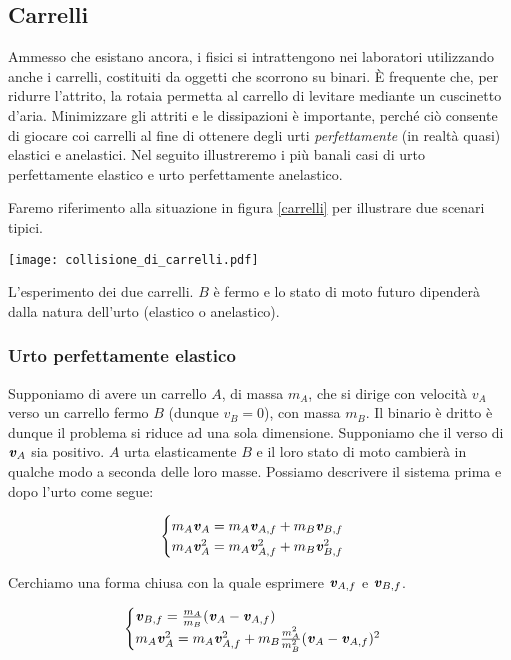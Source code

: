 \subsection{Carrelli}
Ammesso che esistano ancora, i fisici si intrattengono nei laboratori
utilizzando anche i carrelli, costituiti da oggetti che scorrono su
binari. È frequente che, per ridurre l'attrito, la rotaia permetta al
carrello di levitare mediante un cuscinetto d'aria. Minimizzare gli
attriti e le dissipazioni è importante, perché ciò consente di giocare
coi carrelli al fine di ottenere degli urti \textit{perfettamente} (in
realtà quasi) elastici e anelastici. Nel seguito illustreremo i più
banali casi di urto perfettamente elastico e urto perfettamente anelastico.

Faremo riferimento alla situazione in figura \ref{carrelli} per
illustrare due scenari tipici.
\begin{marginfigure}
    \centering
    \texttt{[image: collisione\_di\_carrelli.pdf]}
    \caption{L'esperimento dei due carrelli. $B$ è fermo e lo
    stato di moto futuro dipenderà dalla natura dell'urto (elastico
    o anelastico).}
    \label{carrelli}
\end{marginfigure}

\subsubsection*{Urto perfettamente elastico}
Supponiamo di avere un carrello $A$, di massa $m_A$, che si dirige con velocità $v_A$
verso un carrello fermo $B$ (dunque $v_B = 0$), con massa $m_B$. Il binario è dritto
è dunque il problema si riduce ad una sola dimensione. Supponiamo
che il verso di $\textbf{\textit{v}}_A$ sia positivo. $A$ urta elasticamente
$B$ e il loro stato di moto cambierà in qualche modo a seconda delle
loro masse. Possiamo descrivere il sistema prima e dopo l'urto come
segue:

\[
\begin{cases}
    m_A\textbf{\textit{v}}_A = m_A\textbf{\textit{v}}_{A,f} + m_B\textbf{\textit{v}}_{B,f}\\
    m_A\textbf{\textit{v}}_A^2 = m_A\textbf{\textit{v}}_{A,f}^2 + m_B\textbf{\textit{v}}_{B,f}^2
\end{cases}
\]

\noindent Cerchiamo una forma chiusa con la quale esprimere $\textbf{\textit{v}}_{A,f}$
e $\textbf{\textit{v}}_{B,f}$.

\[
\begin{cases}
    \textbf{\textit{v}}_{B,f} = \frac{m_A}{m_B}(\textbf{\textit{v}}_A - \textbf{\textit{v}}_{A,f})\\
    m_A\textbf{\textit{v}}_A^2 = m_A\textbf{\textit{v}}_{A,f}^2 + m_B \frac{m_A^2}{m_B^2}(\textbf{\textit{v}}_A - \textbf{\textit{v}}_{A,f})^2
\end{cases}
\]

